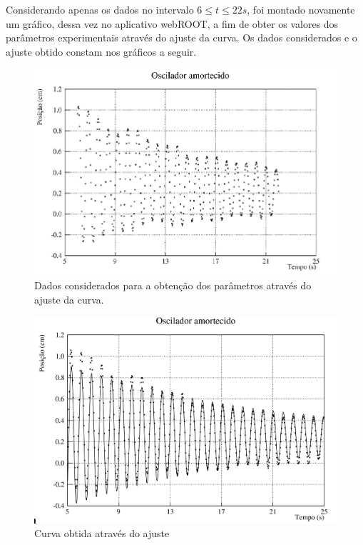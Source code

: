 \documentclass[12pt]{article}
\begin{document}
		Considerando apenas os dados no intervalo $6\leq t \leq 22 s$, foi montado novamente um gráfico, dessa vez no aplicativo webROOT, a fim de obter os valores dos parâmetros experimentais através do ajuste da curva. Os dados considerados e o ajuste obtido constam nos gráficos a seguir.

		\begin{figure}[H]
			\centering
			\includegraphics[width=13cm]{grafico_4.png}
			\caption{ Dados considerados para a obtenção dos parâmetros através do ajuste da curva.}
			\label{fig:grafico_4}
		\end{figure}	
	
		\begin{figure}[H]
			\centering
			\includegraphics[width=13cm]{grafico_5.png}
			\caption{Curva obtida através do ajuste}
			\label{fig:grafico_5}
		\end{figure}
	
\end{document}
